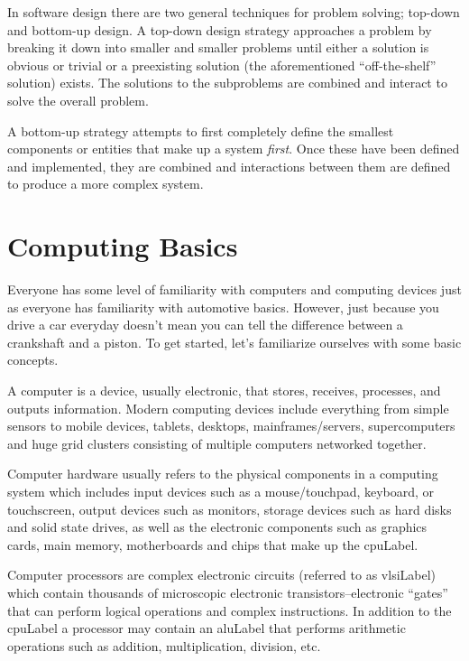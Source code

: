 In software design there are two general techniques for problem solving;
top-down and bottom-up design.  A \gls{top-down design}  strategy approaches a problem
by breaking it down into smaller and smaller problems until either a solution
is obvious or trivial or a preexisting solution (the aforementioned ``off-the-shelf'' 
solution) exists.  The solutions to the subproblems are combined and
interact to solve the overall problem.

A bottom-up  strategy attempts to first completely define the smallest
components or entities that make up a system \emph{first}.  Once these have
been defined and implemented, they are combined and interactions
between them are defined to produce a more complex system.

\section{Computing Basics}

Everyone has some level of familiarity with computers and computing 
devices just as everyone has familiarity with automotive basics.  However, 
just because you drive a car everyday doesn't mean you can tell the 
difference between a crankshaft and a piston.  To get started, let's familiarize
ourselves with some basic concepts.

A computer  is a device, usually electronic, that stores, receives, 
processes, and outputs information.  Modern computing devices include
everything from simple sensors to mobile devices, tablets, desktops, 
mainframes/servers, supercomputers and huge grid clusters consisting
of multiple computers networked together.

Computer hardware  usually refers to the physical components in a 
computing system which includes input devices such as a mouse/touchpad, 
keyboard, or touchscreen, output devices such as monitors, storage 
devices such as hard disks and solid state drives, as well as the
electronic components such as graphics cards, main memory, motherboards and
chips that make up the \gls{cpuLabel}.

Computer processors are complex electronic circuits (referred to as
\gls{vlsiLabel}) which contain thousands of 
microscopic electronic transistors--electronic ``gates'' that can perform
logical operations and complex instructions.  In addition to the \gls{cpuLabel}
a processor may contain an \gls{aluLabel} that performs arithmetic 
operations such as addition, multiplication, division, etc.

